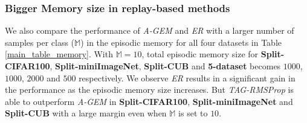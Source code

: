 \documentclass{article} \usepackage{collas2022_conference,times}
\begin{document}
\subsubsection{Bigger Memory size in replay-based methods}\label{agem_er_app}
    We also compare the performance of \textit{A-GEM} and \textit{ER} with a larger number of samples per class ($\mathbb{M}$) in the episodic memory for all four datasets in Table \ref{main_table_memory}. With $\mathbb{M}=10$, total episodic memory size for \textbf{Split-CIFAR100}, \textbf{Split-miniImageNet}, \textbf{Split-CUB} and \textbf{5-dataset} becomes $1000$, $1000$, $2000$ and $500$ respectively. We observe \textit{ER} results in a significant gain in the performance as the episodic memory size increases. But \textit{TAG-RMSProp} is able to outperform \textit{A-GEM} in \textbf{Split-CIFAR100}, \textbf{Split-miniImageNet} and \textbf{Split-CUB} with a large margin even when $\mathbb{M}$ is set to $10$.  
\end{document}
